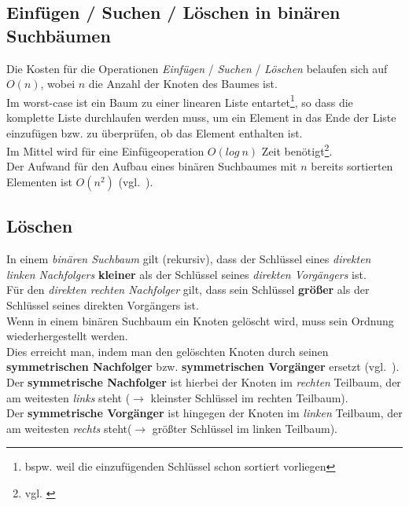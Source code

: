 \subsection{Einfügen / Suchen / Löschen in binären Suchbäumen}

Die Kosten für die Operationen \textit{Einfügen} / \textit{Suchen} / \textit{Löschen} belaufen sich auf $O(n)$, wobei $n$ die Anzahl der Knoten des Baumes ist.\\
Im worst-case ist ein Baum zu einer linearen Liste entartet\footnote{
    bspw. weil die einzufügenden Schlüssel schon sortiert vorliegen
}, so dass die komplette Liste durchlaufen werden muss, um ein Element in das Ende der Liste einzufügen bzw. zu überprüfen, ob das Element enthalten ist.\\

\noindent
Im Mittel wird für eine Einfügeoperation $O(log\ n)$ Zeit benötigt\footnote{
    vgl. \cite[136 ff.]{GD18d}
}.\\


\noindent
Der Aufwand für den Aufbau eines binären Suchbaumes mit $n$ bereits sortierten Elementen ist $O(n^2)$ (vgl.~\cite[235 f.]{GD18d}).


\subsection{Löschen}

In einem \textit{binären Suchbaum} gilt (rekursiv), dass der Schlüssel eines \textit{direkten linken Nachfolgers} \textbf{kleiner} als der Schlüssel seines \textit{direkten Vorgängers} ist.\\
Für den \textit{direkten rechten Nachfolger} gilt, dass sein Schlüssel \textbf{größer} als der Schlüssel seines direkten Vorgängers ist.\\

\noindent
Wenn in einem binären Suchbaum ein Knoten gelöscht wird, muss sein Ordnung wiederhergestellt werden.\\

\noindent
Dies erreicht man, indem man den gelöschten Knoten durch seinen \textbf{symmetrischen Nachfolger} bzw. \textbf{symmetrischen Vorgänger} ersetzt (vgl.~\cite[269, 272]{OW17e}).\\
Der \textbf{symmetrische Nachfolger} ist hierbei der Knoten im \textit{rechten} Teilbaum, der am weitesten \textit{links} steht ($\rightarrow$ kleinster Schlüssel im rechten Teilbaum).\\
Der \textbf{symmetrische Vorgänger} ist hingegen der Knoten im \textit{linken} Teilbaum,  der am weitesten \textit{rechts} steht($\rightarrow$ größter Schlüssel im linken Teilbaum).\\

